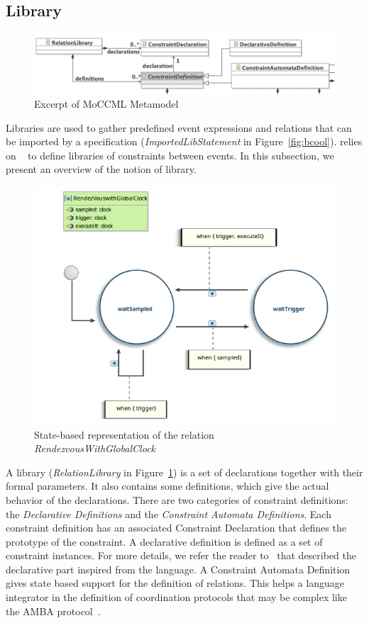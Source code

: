 \subsection{Library}
\label{subsec:bcoollib}

\begin{figure}
	\center
	\includegraphics[width=.8\textwidth]{bcool/figs/moccmlmm}
	\caption{Excerpt of MoCCML Metamodel}
	\label{fig:moccml}
\end{figure}

Libraries are used to gather predefined event expressions and relations that can be imported by a \bcool specification (\emph{ImportedLibStatement} in Figure~\ref{fig:bcool}). \bcool relies on \moccml~\cite{moccmlbib} to define libraries of constraints between events. In this subsection, we present an overview of the notion of \moccml library.

\begin{figure}
	\center
	\includegraphics[width=.7\textwidth]{bcool/figs/moccmllib.jpg}
	\caption{State-based representation of the relation \emph{RendezvousWithGlobalClock}}
	\label{fig:moccmllib}
\end{figure}

A \moccml library (\emph{RelationLibrary} in Figure~\ref{fig:moccml}) is a set of declarations together with their formal parameters. It also contains some definitions, which give the actual behavior of the declarations. There are two categories of constraint definitions: the \emph{Declarative Definitions} and the \emph{Constraint Automata Definitions}. Each constraint definition has an associated Constraint Declaration that defines the prototype of the constraint. A declarative definition is defined as a set of constraint instances. For more details, we refer the reader to~\cite{moccmloperbib} that described the declarative part inspired from the \ccsl language. A Constraint Automata Definition gives state based support for the definition of relations. This helps a language integrator in the definition of coordination protocols that may be complex like the AMBA protocol~\cite{ambabus}. 

